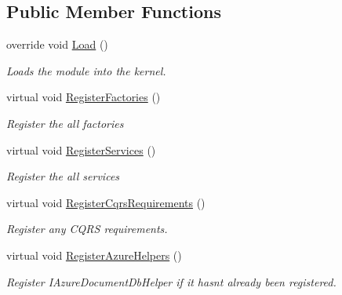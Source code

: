 \subsection*{Public Member Functions}
\begin{DoxyCompactItemize}
\item 
override void \hyperlink{classCqrs_1_1Ninject_1_1Azure_1_1DocumentDb_1_1Configuration_1_1AzureDocumentDbModule_ad9536f1eb7820c9066f2ce5f711ee55e_ad9536f1eb7820c9066f2ce5f711ee55e}{Load} ()
\begin{DoxyCompactList}\small\item\em Loads the module into the kernel. \end{DoxyCompactList}\item 
virtual void \hyperlink{classCqrs_1_1Ninject_1_1Azure_1_1DocumentDb_1_1Configuration_1_1AzureDocumentDbModule_a178aad844dd24aee601e304a0f538108_a178aad844dd24aee601e304a0f538108}{Register\+Factories} ()
\begin{DoxyCompactList}\small\item\em Register the all factories \end{DoxyCompactList}\item 
virtual void \hyperlink{classCqrs_1_1Ninject_1_1Azure_1_1DocumentDb_1_1Configuration_1_1AzureDocumentDbModule_ae47d987c2f32d3167ebda105f5fc8743_ae47d987c2f32d3167ebda105f5fc8743}{Register\+Services} ()
\begin{DoxyCompactList}\small\item\em Register the all services \end{DoxyCompactList}\item 
virtual void \hyperlink{classCqrs_1_1Ninject_1_1Azure_1_1DocumentDb_1_1Configuration_1_1AzureDocumentDbModule_ad541aab18b7ca5082dcabaaa5320a15c_ad541aab18b7ca5082dcabaaa5320a15c}{Register\+Cqrs\+Requirements} ()
\begin{DoxyCompactList}\small\item\em Register any C\+Q\+RS requirements. \end{DoxyCompactList}\item 
virtual void \hyperlink{classCqrs_1_1Ninject_1_1Azure_1_1DocumentDb_1_1Configuration_1_1AzureDocumentDbModule_a6528ff9a0213bc0accd217080ff56653_a6528ff9a0213bc0accd217080ff56653}{Register\+Azure\+Helpers} ()
\begin{DoxyCompactList}\small\item\em Register I\+Azure\+Document\+Db\+Helper if it hasn\textquotesingle{}t already been registered. \end{DoxyCompactList}\end{DoxyCompactItemize}


